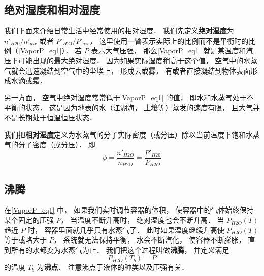 \subsection{绝对湿度和相对湿度}
我们下面来介绍日常生活中经常使用的相对湿度． 我们先定义\textbf{绝对湿度}为 $n'_{H20}/n'_{air}$ 或者 $P'_{H20}/P'_{air}$， 这里使用一瞥表示实际上的比例而不是平衡时的比例（\autoref{VaporP_eq1}）． 若 $P$ 表示大气压强， 那么\autoref{VaporP_eq1} 就是某温度和汽压下可能出现的最大绝对湿度． 因为如果实际湿度稍高于这个值， 空气中的水蒸气就会迅速凝结到空气中的尘埃上， 形成云或雾， 有或者直接凝结到物体表面形成水滴或霜．

另一方面， 空气中绝对湿度常常低于\autoref{VaporP_eq1} 的值， 即水和水蒸气处于不平衡的状态． 这是因为地表的水（江湖海， 土壤等）蒸发的速度有限， 且大气并不是长期处于恒温恒压状态．

我们把\textbf{相对湿度}定义为水蒸气的分子实际密度（或分压）除以当前温度下饱和水蒸气的分子密度（或分压）． 即
\begin{equation}
\phi = \frac{n'_{H2O}}{n_{H2O}} = \frac{P'_{H20}}{P_{H2O}}
\end{equation}

\subsection{沸腾}
在\autoref{VaporP_eq1} 中， 如果我们实时调节容器的体积， 使容器中的气体始终保持某个固定的压强 $P$， 当温度不断升高时， 绝对湿度也会不断升高． 当 $P_{H2O}(T)$ 趋近 $P$ 时， 容器里面就几乎只有水蒸气了． 此时如果温度继续升高使 $P_{H2O}(T)$ 等于或略大于 $P$， 系统就无法保持平衡， 水会不断汽化， 使容器不断膨胀， 直到所有的水都变为水蒸气为止． 我们把这个过程叫做\textbf{沸腾}， 并定义满足
\begin{equation}
P_{H2O}(T_b) = P
\end{equation}
的温度 $T_b$ 为\textbf{沸点}． 注意沸点于液体的种类以及压强有关．
